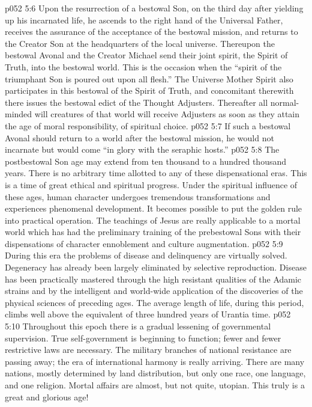 \pc \vs p052 5:6 Upon the resurrection of a bestowal Son, on the third day after yielding up his incarnated life, he ascends to the right hand of the Universal Father, receives the assurance of the acceptance of the bestowal mission, and returns to the Creator Son at the headquarters of the local universe. Thereupon the bestowal Avonal and the Creator Michael send their joint spirit, the Spirit of Truth, into the bestowal world. This is the occasion when the “spirit of the triumphant Son is poured out upon all flesh.” The Universe Mother Spirit also participates in this bestowal of the Spirit of Truth, and concomitant therewith there issues the bestowal edict of the Thought Adjusters. Thereafter all normal\hyp{}minded will creatures of that world will receive Adjusters as soon as they attain the age of moral responsibility, of spiritual choice.
\vs p052 5:7 If such a bestowal Avonal should return to a world after the bestowal mission, he would not incarnate but would come “in glory with the seraphic hosts.”
\pc \vs p052 5:8 The postbestowal Son age may extend from ten thousand to a hundred thousand years. There is no arbitrary time allotted to any of these dispensational eras. This is a time of great ethical and spiritual progress. Under the spiritual influence of these ages, human character undergoes tremendous transformations and experiences phenomenal development. It becomes possible to put the golden rule into practical operation. The teachings of Jesus are really applicable to a mortal world which has had the preliminary training of the prebestowal Sons with their dispensations of character ennoblement and culture augmentation.
\vs p052 5:9 During this era the problems of disease and delinquency are virtually solved. Degeneracy has already been largely eliminated by selective reproduction. Disease has been practically mastered through the high resistant qualities of the Adamic strains and by the intelligent and world\hyp{}wide application of the discoveries of the physical sciences of preceding ages. The average length of life, during this period, climbs well above the equivalent of three hundred years of Urantia time.
\vs p052 5:10 Throughout this epoch there is a gradual lessening of governmental supervision. True self\hyp{}government is beginning to function; fewer and fewer restrictive laws are necessary. The military branches of national resistance are passing away; the era of international harmony is really arriving. There are many nations, mostly determined by land distribution, but only one race, one language, and one religion. Mortal affairs are almost, but not quite, utopian. This truly is a great and glorious age!
